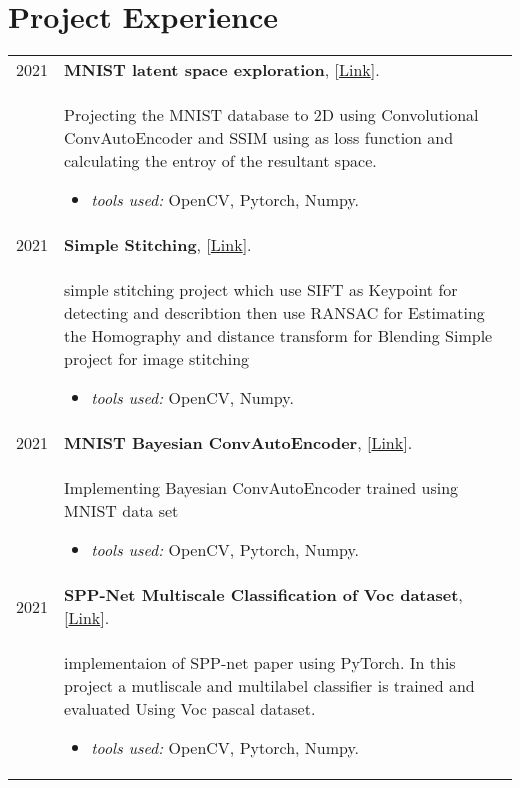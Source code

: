 \documentclass[a4paper,10pt]{article}
\begin{document}
\section{\textbf{Project Experience}}  
    \begin{longtable}{r p{16cm}}

        2021  & \textbf{MNIST latent space exploration}, [\href{https://github.com/zaky-fetoh/MNIST_latent_space_exploring}{Link}].\\&
        Projecting the MNIST database to 2D using Convolutional ConvAutoEncoder and SSIM using as loss function and calculating the entroy of the resultant space.
        \begin{itemize}
            \item \textit{tools used: } OpenCV, Pytorch, Numpy.
        \end{itemize}\\


        2021  & \textbf{Simple Stitching}, [\href{https://github.com/zaky-fetoh/stitching}{Link}].\\&
        simple stitching project which use SIFT as Keypoint for detecting and describtion then use RANSAC for Estimating the Homography and distance transform for Blending Simple project for image stitching
        \begin{itemize}
            \item \textit{tools used: } OpenCV, Numpy.
        \end{itemize}\\

        2021  & \textbf{MNIST Bayesian ConvAutoEncoder}, [\href{https://github.com/zaky-fetoh/MNIST-BayesianConvAutoEncoder}{Link}].\\&
        Implementing Bayesian ConvAutoEncoder trained using MNIST data set
        \begin{itemize}
            \item \textit{tools used: } OpenCV, Pytorch, Numpy.
        \end{itemize}\\

        2021  & \textbf{SPP-Net Multiscale Classification of Voc dataset}, [\href{https://github.com/zaky-fetoh/SPP-Net-implementation-for-multiscale-classification-of-VOC-dataset}{Link}].\\&
        implementaion of SPP-net paper using PyTorch. In this project a mutliscale and multilabel classifier is trained and evaluated Using Voc pascal dataset.
        \begin{itemize}
            \item \textit{tools used: } OpenCV, Pytorch, Numpy.
        \end{itemize}\\



\end{longtable}
\end{document}
